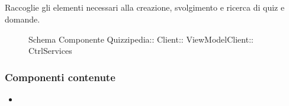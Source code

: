 \subsection{}
Raccoglie gli elementi necessari alla creazione, svolgimento e ricerca di quiz e domande.
\begin{figure}[H]
\centering
\noindent{}
\caption[Schema Componente CtrlServices]{Schema Componente Quizzipedia:: Client:: ViewModelClient:: CtrlServices}
\end{figure}
\subsubsection{Componenti contenute}
\begin{itemize}
\item {}
\end{itemize}
